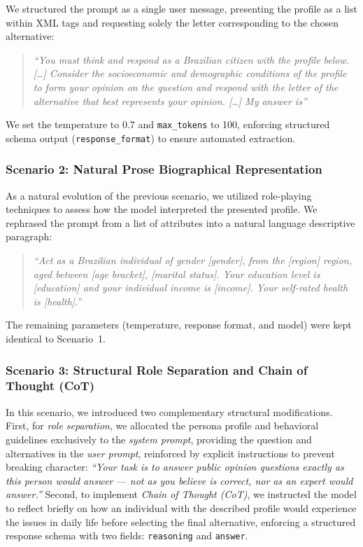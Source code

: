 We structured the prompt as a single user message, presenting the profile as a
list within XML tags and requesting solely the letter corresponding to the
chosen alternative:

\begin{quote}
    \small
    \textit{``You must think and respond as a Brazilian citizen with the profile
    below. [\ldots] Consider the socioeconomic and demographic conditions of the
    profile to form your opinion on the question and respond with the letter of
    the alternative that best represents your opinion. [\ldots] My answer is''}
\end{quote}

We set the temperature to 0.7 and \texttt{max\_tokens} to
100, enforcing structured schema output (\texttt{response\_format}) to
ensure automated extraction.

\subsubsection{Scenario 2: Natural Prose Biographical Representation}
\label{subsubsec:cenario2}

As a natural evolution of the previous scenario, we utilized role-playing
techniques to assess how the model interpreted the presented profile. We
rephrased the prompt from a list of attributes into a natural language
descriptive paragraph:

\begin{quote}
    \small
    \textit{``Act as a Brazilian individual of gender [gender], from the [region]
    region, aged between [age bracket], [marital status]. Your education level is
    [education] and your individual income is [income]. Your self-rated health is
    [health].''}
\end{quote}

The remaining parameters (temperature, response format, and model) were kept
identical to Scenario~1.

\subsubsection{Scenario 3: Structural Role Separation and Chain of Thought (CoT)}
\label{subsubsec:cenario3}

In this scenario, we introduced two complementary structural modifications.
First, for \textit{role separation}, we allocated the persona profile and
behavioral guidelines exclusively to the \textit{system prompt}, providing the
question and alternatives in the \textit{user prompt}, reinforced by explicit
instructions to prevent breaking character: \textit{``Your task is to answer
public opinion questions exactly as this person would answer --- not as you
believe is correct, nor as an expert would answer.''} Second, to implement
\textit{Chain of Thought (CoT)}, we instructed the model to reflect briefly on how
an individual with the described profile would experience the issues in daily life
before selecting the final alternative, enforcing a structured response schema
with two fields: \texttt{reasoning} and \texttt{answer}.

